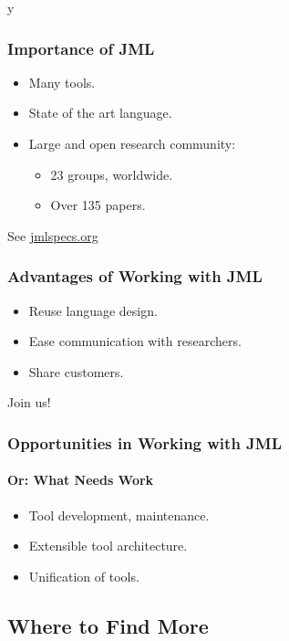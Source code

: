 \if y\MAKEHANDOUTS \documentclass[t,compress,landscape,handout]{beamer}
\begin{document}
\begin{frame}
\frametitle{Importance of JML}

\begin{itemize}
\item
Many tools.

\item
State of the art language.

\item
Large and open research community:
\begin{itemize}
\item
23 groups, worldwide.

\item
Over 135 papers.
\end{itemize}
\end{itemize}

See \href{http://www.jmlspecs.org}{jmlspecs.org}
\end{frame}

\begin{frame}[label=advantages]
\frametitle{Advantages of Working with JML}

\begin{itemize}
\item
Reuse language design.

\item
Ease communication with researchers.

\item
Share customers.
\end{itemize}

Join us!
\end{frame}

\begin{frame}[label=opportunities]
\frametitle{Opportunities in Working with JML}
\framesubtitle{Or: What Needs Work}

\begin{itemize}
\item
Tool development, maintenance.

\item
Extensible tool architecture.

\item
Unification of tools.
\end{itemize}
\end{frame}

\subsection[Finding More]{Where to Find More}
\end{document}
